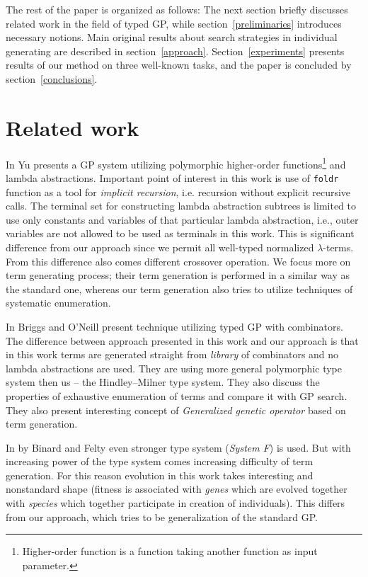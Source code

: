 \documentclass{llncs}
\newcommand{\lterms}{$\lambda$-terms\xspace}
\begin{document}

The rest of the paper is organized as follows: The next section briefly discusses related work in the field of typed GP, while section~\ref{preliminaries} introduces necessary notions. Main original results about search strategies in individual generating are described in section~\ref{approach}. Section~\ref{experiments} presents results of our method on three well-known tasks, and the paper is concluded by section~\ref{conclusions}.

\section{Related work}
\label{related}


In \cite{yu01} Yu presents a GP system utilizing
polymorphic higher-order functions\footnote{Higher-order 
function is a function taking another function as 
input parameter.} and lambda abstractions.
Important point of interest in this work is use of
\texttt{foldr} function as a tool for \textit{implicit recursion},
i.e. recursion without explicit recursive calls. 
The terminal set for constructing lambda abstraction subtrees 
is limited to use only constants and variables of that particular
lambda abstraction, i.e., outer variables are not allowed to be used
as terminals in this work. This is significant difference from our approach 
since we permit all well-typed normalized \lterms. From this difference also
comes different crossover operation. We focus more on term generating process; 
their term generation is performed in a similar way as the standard one, 
whereas our term generation also tries to utilize techniques of systematic enumeration. 

In \cite{kes} Briggs and O’Neill present technique 
utilizing typed GP with combinators.
The difference between approach presented in this work
and our approach is that in this work terms are generated
straight from \textit{library} of combinators and no lambda abstractions
are used. They are using more general polymorphic type system then us
-- the Hindley–Milner type system. They also discuss the 
properties of exhaustive enumeration of terms and compare it with GP search.  
They also present interesting concept of \textit{Generalized
genetic operator} based on term generation. 

In \cite{binard2008genetic} by Binard and Felty even 
stronger type system (\textit{System F}) is used.  
But with increasing power of the type system comes increasing difficulty of term generation.
For this reason evolution in this work takes interesting and nonstandard shape 
(fitness is associated with \textit{genes} which are evolved together with \textit{species}
which together participate in creation of individuals).
This differs from our approach, which tries to be generalization of
the standard GP\cite{koza92}.
\end{document}
